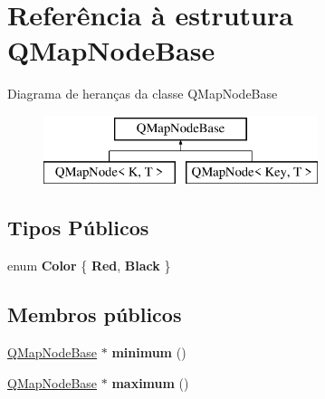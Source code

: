 \hypertarget{struct_q_map_node_base}{\section{Referência à estrutura Q\-Map\-Node\-Base}
\label{struct_q_map_node_base}
}
Diagrama de heranças da classe Q\-Map\-Node\-Base\begin{figure}[H]
\begin{center}
\leavevmode
\includegraphics[height=2.000000cm]{struct_q_map_node_base}
\end{center}
\end{figure}
\subsection*{Tipos Públicos}
\begin{DoxyCompactItemize}
\item 
enum {\bfseries Color} \{ {\bfseries Red}, 
{\bfseries Black}
 \}
\end{DoxyCompactItemize}
\subsection*{Membros públicos}
\begin{DoxyCompactItemize}
\item 
\hypertarget{struct_q_map_node_base_abe1fb930f4b51573d5850c1053de2306}{\hyperlink{struct_q_map_node_base}{Q\-Map\-Node\-Base} $\ast$ {\bfseries minimum} ()}\label{struct_q_map_node_base_abe1fb930f4b51573d5850c1053de2306}

\item 
\hypertarget{struct_q_map_node_base_aa03f0b68d572a7b063e1bb0b9a0476b1}{\hyperlink{struct_q_map_node_base}{Q\-Map\-Node\-Base} $\ast$ {\bfseries maximum} ()}\label{struct_q_map_node_base_aa03f0b68d572a7b063e1bb0b9a0476b1}

\end{DoxyCompactItemize}
